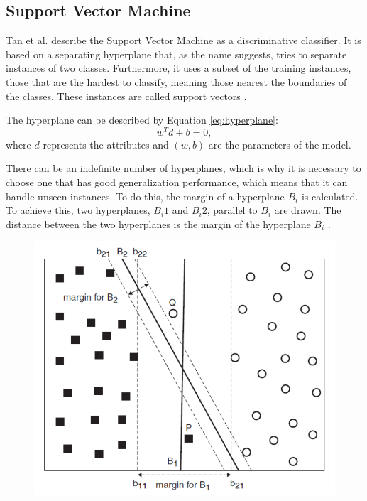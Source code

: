 \subsection{Support Vector Machine}
Tan et al. describe the Support Vector Machine as a discriminative classifier. It is based on a separating hyperplane that, as the name suggests, tries to separate instances of two classes. Furthermore, it uses a subset of the training instances, those that are the hardest to classify, meaning those nearest the boundaries of the classes. These instances are called support vectors \cite{DBLP:books/aw/TanSKK2019}.

The hyperplane can be described by Equation \eqref{eq:hyperplane}:
    \begin{equation}
            \label{eq:hyperplane}
                w^Td + b = 0,
        \end{equation}
    where $d$ represents the attributes and $(w, b)$ are the parameters of the model. 
    
    There can be an indefinite number of hyperplanes, which is why it is necessary to choose one that has good generalization performance, which means that it can handle unseen instances. To do this, the margin of a hyperplane $B_i$ is calculated. To achieve this, two hyperplanes, $B_i1$ and $B_i2$, parallel to $B_i$ are drawn. The distance between the two hyperplanes is the margin of the hyperplane $B_i$ \cite{DBLP:books/aw/TanSKK2019}.
    \begin{figure}
        \centering
        \caption{
        \label{fig:svm}
        }
        \includegraphics[scale=0.8]{Images/SVM_image.png}
    \end{figure}
    
